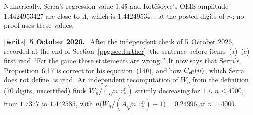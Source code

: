 \documentclass[11pt,letterpaper]{article}
\theoremstyle{remark}\newtheorem{remark}[theorem]{Remark}
\numberwithin{equation}{section}
\newenvironment{writenote}[1][]{\par\smallskip\begingroup\small
 \noindent\textbf{[write]}\if\relax\detokenize{#1}\relax\else~\textbf{#1.}\fi\ }%
 {\par\endgroup\smallskip}
\begin{document}
Numerically, Serra's regression value $1.46$ and Kot\v{e}\v{s}ovec's OEIS amplitude $1.4424953427$ are close to $A$, which is $1.44249534\ldots$ at the posted digits of $r_*$; no proof uses these values.
\begin{writenote}[5 October 2026]
After the independent check of 5~October 2026, recorded at the end of Section~\ref{ppg:sec:further}: the sentence before items~(a)--(c) first read ``For the game these statements are wrong:''. It now says that Serra's Proposition~6.17 is correct for his equation~(140), and how $C_{\rm eff}(n)$, which Serra does not define, is read. An independent recomputation of $W_n$ from the definition (70 digits, uncertified) finds $W_n/(\sqrt n\,r_*^n)$ strictly decreasing for $1\le n\le4000$, from $1.7377$ to $1.442585$, with $n\bigl(W_n/(A\sqrt n\,r_*^n)-1\bigr)=0.24996$ at $n=4000$.
\end{writenote}
\end{document}
